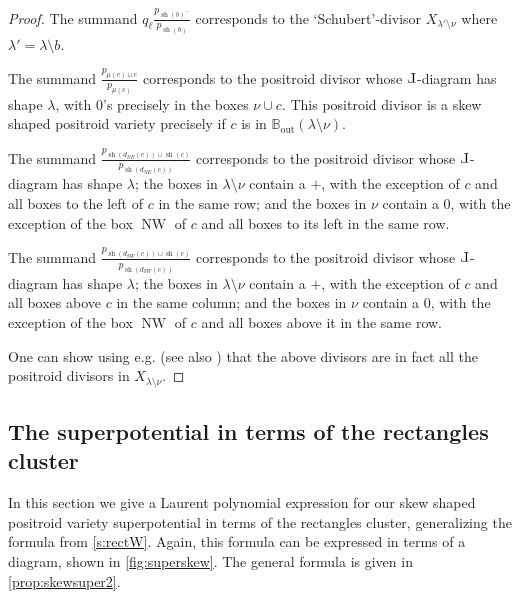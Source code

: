 \documentclass{amsart}
\def\Le{\hbox{\rotatebox[origin=c]{180}{$\Gamma$}}}
\theoremstyle{definition}
\numberwithin{equation}{section}
\def\sh{\operatorname{sh}}
\def\NW{\operatorname{NW}}
\def\out{\operatorname{out}}
\newcommand{\BB}{{\mathbb B}}
\begin{document}
\begin{proof}
The summand $q_\ell \frac{p_{\sh(b)^-}}{p_{\sh(b)}}$ corresponds to the `Schubert'-divisor $X_{\lambda'\setminus\nu}$ where $\lambda'=\lambda\setminus b$. 

The summand $\frac{p_{\mu(c)\sqcup c}}{p_{\mu(c)}}$  corresponds to the positroid divisor whose $\Le$-diagram has shape $\lambda$, with $0$'s precisely in the boxes $\nu\cup c$. This positroid divisor is a skew shaped positroid variety precisely if $c$ is in $\BB_{\out}(\lambda\setminus\nu)$.  

The summand
$\frac{p_{\sh(d_{NE}(c))\cup \sh(c)}}{p_{\sh(d_{NE}(c))}}$
corresponds to the positroid divisor whose $\Le$-diagram has shape $\lambda$; 
the boxes in $\lambda\setminus\nu$ contain a $+$, with the exception of $c$ and all boxes to the left of $c$ in the same row; and the boxes in $\nu$ contain a $0$, with the exception of the box $\NW$ of $c$ and all boxes to its left in the same row.   

The summand 
$\frac{p_{\sh(d_{SW}(c))\cup \sh(c)}}{p_{\sh(d_{SW}(c))}}$
corresponds to the positroid divisor whose $\Le$-diagram has
shape $\lambda$; the boxes in $\lambda\setminus\nu$ contain a $+$, with the exception of $c$ and all boxes above $c$ in the same column; and the boxes in $\nu$ contain a $0$, with the exception of the box $\NW$ of $c$ and all boxes above it in the same row.  

	One can show using e.g. \cite[Proposition 7.2]{RietschClosure} (see also 
\cite[Section 5 and Appendix A]{shelling}) 
that the above divisors are in fact all the positroid divisors
 in $X_{\lambda\setminus\nu}$. 
\end{proof}

\subsection{The superpotential in terms  of the rectangles cluster}\label{s:skewrectW}

In this section we give a Laurent polynomial expression for our 
skew shaped positroid variety  superpotential 
in terms of the rectangles cluster, 
generalizing the formula
from  \cref{s:rectW}.
Again, this formula can be expressed
in terms of a diagram, shown in \cref{fig:superskew}.
The general formula is given in
\cref{prop:skewsuper2}.
\end{document}
